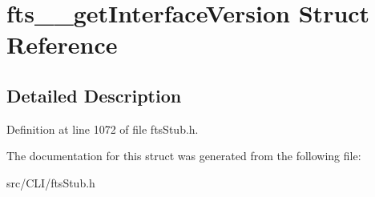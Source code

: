\section{fts\_\-\_\-getInterfaceVersion Struct Reference}
\label{structfts____getInterfaceVersion}


\subsection{Detailed Description}


Definition at line 1072 of file ftsStub.h.



The documentation for this struct was generated from the following file:\begin{DoxyCompactItemize}
\item 
src/CLI/ftsStub.h\end{DoxyCompactItemize}
